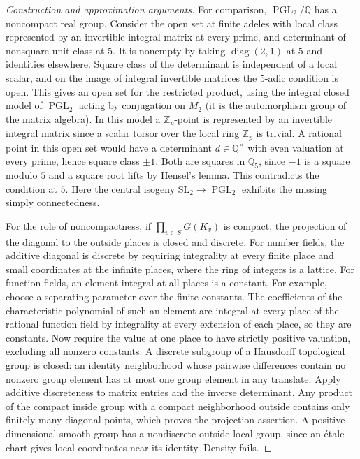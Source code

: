 \documentclass[11pt,a4paper,openany,oneside]{book}
\theoremstyle{resultstyle}
\theoremstyle{definition}
\numberwithin{equation}{chapter}
\newcommand{\SL}{\mathrm{SL}}
\newcommand{\ZZ}{\mathbb{Z}}
\newcommand{\QQ}{\mathbb{Q}}
\begin{document}
\begin{proof}[Construction and approximation arguments]
For comparison, $\operatorname{PGL}_2/\QQ$ has a noncompact real group. Consider the open set at finite adeles with local class represented by an invertible integral matrix at every prime, and determinant of nonsquare unit class at $5$. It is nonempty by taking $\operatorname{diag}(2,1)$ at $5$ and identities elsewhere. Square class of the determinant is independent of a local scalar, and on the image of integral invertible matrices the $5$-adic condition is open. This gives an open set for the restricted product, using the integral closed model of $\operatorname{PGL}_2$ acting by conjugation on $M_2$ (it is the automorphism group of the matrix algebra). In this model a $\ZZ_p$-point is represented by an invertible integral matrix since a scalar torsor over the local ring $\ZZ_p$ is trivial. A rational point in this open set would have a determinant $d\in\QQ^\times$ with even valuation at every prime, hence square class $\pm1$. Both are squares in $\QQ_5$, since $-1$ is a square modulo $5$ and a square root lifts by Hensel's lemma. This contradicts the condition at $5$. Here the central isogeny $\SL_2\to\operatorname{PGL}_2$ exhibits the missing simply connectedness.

For the role of noncompactness, if $\prod_{v\in S}G(K_v)$ is
compact, the projection of the diagonal to the outside places
is closed and discrete. For number fields, the additive
diagonal is discrete by requiring integrality at every finite
place and small coordinates at the infinite places, where the
ring of integers is a lattice. For function fields, an element
integral at all places is a constant. For example, choose a
separating parameter over the finite constants. The coefficients
of the characteristic polynomial of such an element are
integral at every place of the rational function field by
integrality at every extension of each place, so they are
constants. Now require the value at one place to have
strictly positive valuation, excluding all nonzero constants.
A discrete subgroup of a Hausdorff topological group is closed:
an identity neighborhood whose pairwise differences contain no
nonzero group element has at most one group element in any
translate. Apply additive discreteness to matrix entries and
the inverse determinant. Any product of the compact inside
group with a compact neighborhood outside contains only
finitely many diagonal points, which proves the projection
assertion. A positive-dimensional smooth group has a
nondiscrete outside local group, since an \'etale chart
gives local coordinates near its identity. Density fails.


\end{proof}
\end{document}
